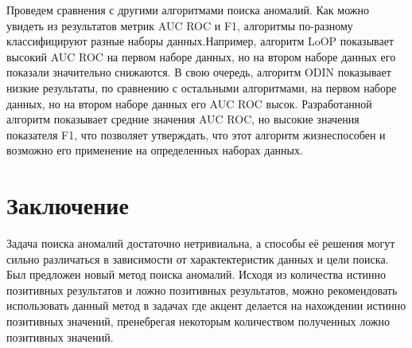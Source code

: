 Проведем сравнения с другими алгоритмами поиска аномалий.
Как можно увидеть из результатов  метрик AUC ROC и F1, алгоритмы по-разному классифицируют  разные наборы данных.Например, алгоритм LoOP показывает высокий AUC ROC на первом наборе данных, но на втором наборе данных его показали значительно снижаются. В свою очередь, алгоритм ODIN показывает низкие результаты, по сравнению с остальными алгоритмами, на первом наборе данных, но на втором наборе данных его AUC ROC высок. Разработанной алгоритм показывает средние значения AUC ROC, но высокие значения показателя F1, что позволяет утверждать, что этот алгоритм жизнеспособен и возможно его применение на определенных наборах данных. 




\section*{Заключение}
Задача поиска аномалий достаточно нетривиальна, а способы её решения могут сильно различаться в зависимости от характектеристик данных и цели поиска. Был предложен новый метод поиска аномалий. Исходя из количества истинно позитивных результатов и ложно позитивных результатов, можно рекомендовать использовать данный метод в задачах где акцент делается на нахождении истинно позитивных значений, пренебрегая некоторым количеством полученных ложно позитивных значений.
